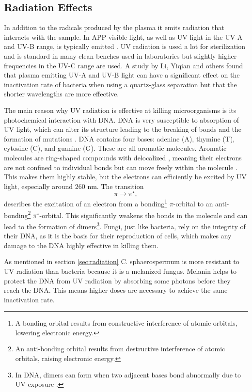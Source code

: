 \subsection{Radiation Effects}
In addition to the radicals produced by the plasma it emits radiation that interacts with the sample. In APP visible light, as well as UV light in the UV-A and UV-B range, is typically emitted \cite{plasma2}. UV radiation is used a lot for sterilization and is standard in many clean benches used in laboratories but slightly higher frequencies in the UV-C range are used. A study by Li, Yiqian and others \cite{bacteria} found that plasma emitting UV-A and UV-B light can have a significant effect on the inactivation rate of bacteria when using a quartz-glass separation but that the shorter wavelengths are more effective.

The main reason why UV radiation is effective at killing microorganisms is its photochemical interaction with DNA. DNA is very susceptible to absorption of UV light, which can alter its structure leading to the breaking of bonds and the formation of mutations \cite{DNA}. DNA contains four bases: adenine (A), thymine (T), cytosine (C), and guanine (G). These are all aromatic molecules. Aromatic molecules are ring-shaped compounds with delocalized , meaning their electrons are not confined to individual bonds but can move freely within the molecule \cite{DNA}. This makes them highly stable, but the electrons can efficiently  be excited by  UV light, especially around 260 nm. The transition \begin{equation}
    \pi \rightarrow \pi ^\star,
\end{equation}
describes the excitation of an electron from a bonding\footnote{A bonding orbital results from constructive interference of atomic orbitals, lowering electronic energy.} $\pi$-orbital to an anti-bonding\footnote{An anti-bonding orbital results from destructive interference of atomic orbitals, raising electronic energy.}  $\pi^\star$-orbital. This significantly weakens the bonds in the molecule and can lead to the formation of dimers\footnote{In DNA, dimers can form when two adjacent bases bond abnormally due to UV exposure \cite{DNA}.}. Fungi, just like bacteria, rely on the integrity of their DNA, as it is the basis for their reproduction of cells, which makes any damage to the DNA highly effective in killing them.

As mentioned in section \ref{sec:radiation} C. sphaerospermum is more resistant to UV radiation than bacteria because it is a melanized fungus. Melanin helps to protect the DNA from UV radiation by absorbing some photons before they reach the DNA. This means higher doses are necessary to achieve the same inactivation rate.
